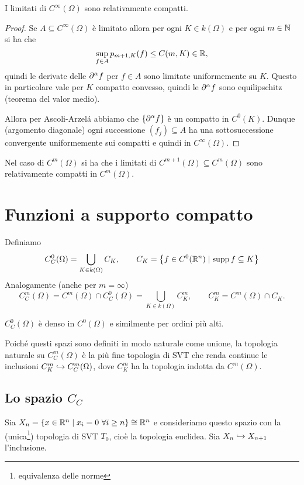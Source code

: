 \begin{remark}
I limitati di $C^\infty(\Omega)$ sono relativamente compatti.
\end{remark}
\begin{proof}
Se $A\subseteq C^\infty(\Omega)$ \`e limitato allora per ogni $K\in k(\Omega)$ e per ogni $m\in \mathbb{N}$ si ha che 
\[\sup_{f\in A}p_{m+1,K}(f)\leq C(m,K)\in\mathbb{R},\]
quindi le derivate delle $\partial^\alpha f$ per $f\in A$ sono limitate uniformemente su $K$. Questo in particolare vale per $K$ compatto convesso, quindi le $\partial^\alpha f$ sono equilipschitz (teorema del valor medio).

Allora per Ascoli-Arzel\'a abbiamo che $\left\{{\partial^\alpha f}\right\}$ \`e un compatto in $C^0(K)$. Dunque (argomento diagonale) ogni successione $(f_j)\subseteq A$ ha una sottosuccessione convergente uniformemente sui compatti e quindi in $C^\infty(\Omega)$.
\end{proof}

\begin{remark}
Nel caso di $C^m(\Omega)$ si ha che i limitati di $C^{m+1}(\Omega)\subseteq C^m(\Omega)$ sono relativamente compatti in $C^m(\Omega)$.
\end{remark}

\section{Funzioni a supporto compatto}

\begin{definition}
Definiamo
\[C^0_C(\Omega)=\bigcup_{K\in k(\Omega)}C_K,\qquad C_K=\left\{{f\in C^0(\mathbb{R}^n)\mid \operatorname{supp} f\subseteq K}\right\}\]
Analogamente (anche per $m=\infty$)
\[C_C^m(\Omega)=C^m(\Omega)\cap C^0_C(\Omega)=\bigcup_{K\in k(\Omega)}C^m_K,\qquad C_K^m=C^m(\Omega)\cap C_K.\]
\end{definition}

\begin{remark}
$C^0_C(\Omega)$ \`e denso in $C^0(\Omega)$ e similmente per ordini pi\`u alti.
\end{remark}

Poich\'e questi spazi sono definiti in modo naturale come unione, la topologia naturale su $C_C^m(\Omega)$ \`e la pi\`u fine topologia di SVT che renda continue le inclusioni $C_K^m\hookrightarrow C^m_C(\Omega)$, dove $C^m_K$ ha la topologia indotta da $C^m(\Omega)$.






\subsection{Lo spazio \texorpdfstring{$C_C$}{CC}}
Sia $X_n=\left\{{x\in\mathbb{R}^n\mid x_i=0\ \forall i\geq n}\right\}\cong \mathbb{R}^n$ e consideriamo questo spazio con la (unica\footnote{equivalenza delle norme}) topologia di SVT $T_0$, cio\`e la topologia euclidea. Sia $X_n\hookrightarrow X_{n+1}$ l'inclusione.


